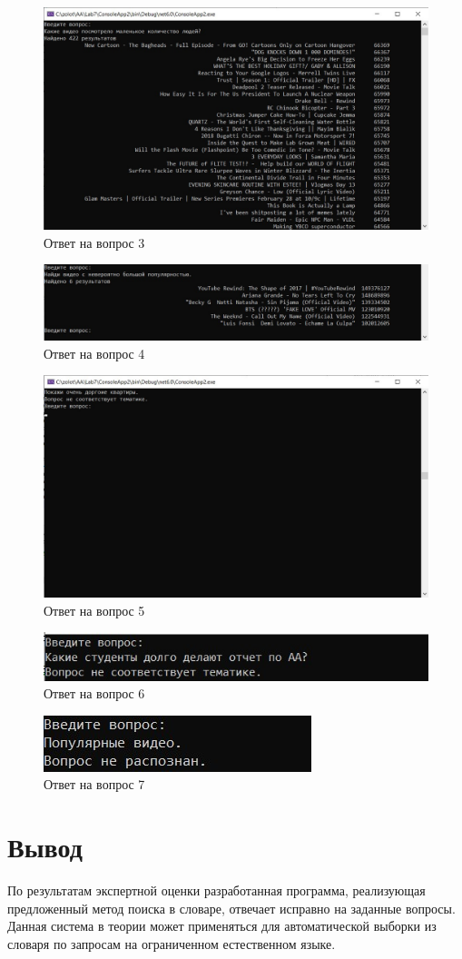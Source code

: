 \begin{figure}[H]
	\centering
	\includegraphics[width=1\linewidth]{inc/img/q3}
	\caption{Ответ на вопрос 3}
	\label{fig:q3}
\end{figure}
\begin{figure}[H]
	\centering
	\includegraphics[width=1\linewidth]{inc/img/q4}
	\caption{Ответ на вопрос 4}
	\label{fig:q4}
\end{figure}
\begin{figure}[H]
	\centering
	\includegraphics[width=1\linewidth]{inc/img/q5}
	\caption{Ответ на вопрос 5}
	\label{fig:q5}
\end{figure}
\begin{figure}[H]
	\centering
	\includegraphics[width=0.5\linewidth]{inc/img/q6}
	\caption{Ответ на вопрос 6}
	\label{fig:q6}
\end{figure}
\begin{figure}[H]
	\centering
	\includegraphics[width=0.3\linewidth]{inc/img/q7}
	\caption{Ответ на вопрос 7}
	\label{fig:q7}
\end{figure}
\section{Вывод}

По результатам экспертной оценки разработанная программа, реализующая предложенный метод поиска в словаре, отвечает исправно на заданные вопросы. Данная система в теории может применяться для автоматической выборки из словаря по запросам на ограниченном естественном языке.